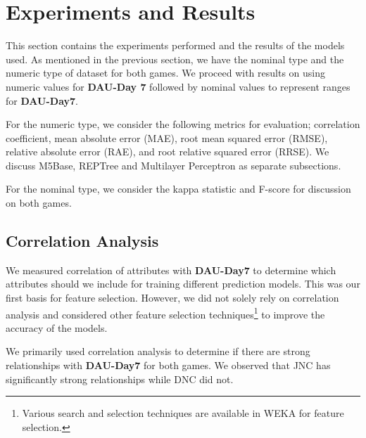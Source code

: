 \section{Experiments and Results}
This section contains the experiments performed and the results of the models used. As mentioned in the previous section, we have the nominal type and the numeric type of dataset for both games. We proceed with results on using numeric values for \textbf{DAU-Day 7} followed by nominal values to represent ranges for \textbf{DAU-Day7}.

For the numeric type, we consider the following metrics for evaluation; correlation coefficient, mean absolute error (MAE), root mean squared error (RMSE), relative absolute error (RAE), and root relative squared error (RRSE). We discuss M5Base, REPTree and Multilayer Perceptron as separate subsections.

For the nominal type, we consider the kappa statistic and F-score for discussion on both games.

\subsection{Correlation Analysis}
We measured correlation of attributes with \textbf{DAU-Day7} to determine which attributes should we include for training different prediction models. This was our first basis for feature selection. However, we did not solely rely on correlation analysis and considered other feature selection techniques\footnote{Various search and selection techniques are available in WEKA for feature selection.} to improve the accuracy of the models.

We primarily used correlation analysis to determine if there are strong relationships with \textbf{DAU-Day7} for both games. We observed that JNC has significantly strong relationships while DNC did not.

